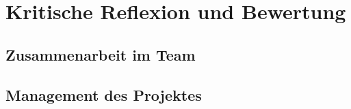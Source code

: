 \section{Kritische Reflexion und Bewertung}

\subsection{Zusammenarbeit im Team}

\subsection{Management des Projektes}